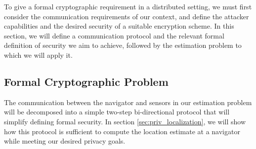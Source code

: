 \documentclass[10pt,letterpaper,oneside,twocolumn,journal]{IEEEtran}
\theoremstyle{definition}
\theoremstyle{definition}
\theoremstyle{remark}
\begin{document}
To give a formal cryptographic requirement in a distributed setting, we must first consider the communication requirements of our context, and define the attacker capabilities and the desired security of a suitable encryption scheme. In this section, we will define a communication protocol and the relevant formal definition of security we aim to achieve, followed by the estimation problem to which we will apply it.

% 
% 

\subsection{Formal Cryptographic Problem} \label{subsec:crypto_problem}
The communication between the navigator and sensors in our estimation problem will be decomposed into a simple two-step bi-directional protocol that will simplify defining formal security. In section \ref{sec:priv_localization}, we will show how this protocol is sufficient to compute the location estimate at a navigator while meeting our desired privacy goals.
\end{document}
